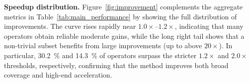 \documentclass{article}
\makeatletter
\theoremstyle{plain}
\theoremstyle{definition}
\theoremstyle{remark}
\newcommand{\Rmnum}[1]{\expandafter\@slowromancap\romannumeral #1@}
\makeatother
\begin{document}
\noindent\textbf{Speedup distribution.}
Figure~\ref{fig:improvement} complements the aggregate metrics in Table~\ref{tab:main_performance} by showing the full distribution of improvements. The curve rises rapidly near $1.0\times$--$1.2\times$, indicating that many operators obtain reliable moderate gains, while the long right tail shows that a non-trivial subset benefits from large improvements (up to above $20\times$). In particular, \SI{30.2}{\percent} and \SI{14.3}{\percent} of operators surpass the stricter $1.2\times$ and $2.0\times$ thresholds, respectively, confirming that the method improves both broad coverage and high-end acceleration.

\end{document}
